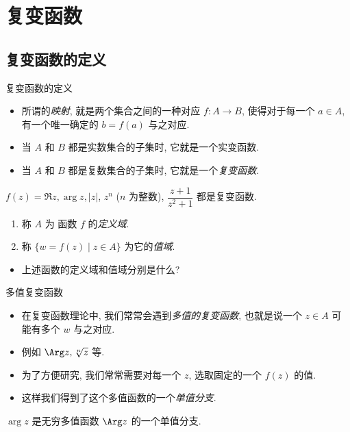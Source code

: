 \section{复变函数}


\subsection{复变函数的定义}


\begin{frame}{复变函数的定义}
	\begin{itemize}
		\item 所谓的\emph{映射}, 就是两个集合之间的一种对应 $f:A\to B$, 使得对于每一个 $a\in A$, 有一个唯一确定的 $b=f(a)$ 与之对应.
		\item 当 $A$ 和 $B$ 都是实数集合的子集时, 它就是一个实变函数.
		\item 当 $A$ 和 $B$ 都是复数集合的子集时, 它就是一个\emph{复变函数}.
	\end{itemize}
	\onslide<+->
	\begin{example}[nearnext]
		$f(z)=\Re z,\arg z,|z|$, $z^n$ ($n$ 为整数), $\dfrac{z+1}{z^2+1}$ 都是复变函数.
	\end{example}
	\onslide<+->
	\begin{definition}
		\begin{enumerate}
			\item 称 $A$ 为 函数 $f$ 的\emph{定义域}.
			\item 称 $\{w=f(z)\mid z\in A\}$ 为它的\emph{值域}.
		\end{enumerate} 
	\end{definition}
	\begin{itemize}
		\item 上述函数的定义域和值域分别是什么?
	\end{itemize}
\end{frame}


\begin{frame}{多值复变函数}
	\begin{itemize}
		\item 在复变函数理论中, 我们常常会遇到\emph{多值的复变函数}, 也就是说一个 $z\in A$ 可能有多个 $w$ 与之对应.
		\item 例如 $\Arg z,\sqrt[n]z$ 等.
		\item 为了方便研究, 我们常常需要对每一个 $z$, 选取固定的一个 $f(z)$ 的值.
		\item 这样我们得到了这个多值函数的一个\emph{单值分支}.
	\end{itemize}
	\onslide<+->
	\begin{example}
		$\arg z$ 是无穷多值函数 $\Arg z$ 的一个单值分支.
	\end{example}
\end{frame}


